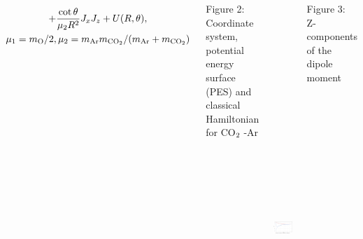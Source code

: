 \documentclass[
  20pt,
  a0paper,
  portrait,
  margin=0mm,
  innermargin=15mm,
  blockverticalspace=0mm,
  colspace=0mm,
  subcolspace=0mm
]{tikzposter}
\begin{document}
\begin{columns}
{{\begin{gather}
+ \frac{\cot \theta}{\mu_2 R^2} J_x J_z + U(R, \theta), \notag \\
\mu_1 = m_{\textup{O}} / 2, \mu_2 = m_{\textup{Ar}} m_{\textup{CO}_2} / (m_{\textup{Ar}} + m_{\textup{CO}_2}) \notag
\end{gather}
\begin{center}
Figure 2: Coordinate system, potential energy surface (PES) and classical Hamiltonian for CO$_2 \hspace{0.1cm}$-Ar
\end{center}

\vspace{1cm}
\begin{minipage}{0.5\linewidth}
\begin{tikzfigure}
		\includegraphics[height=17cm,width=0.95\linewidth]{../pictures/dipole_pictures/last-crop.pdf}
\end{tikzfigure}
\begin{center}
\vspace*{-0.5cm}
Figure 3: Z-components of the dipole moment \label{fig:dipole}

\end{center}
\end{minipage}}}
\end{columns}
\end{document}
